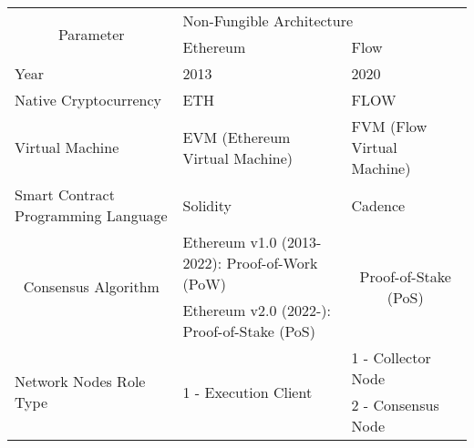 \usepackage{booktabs}
\usepackage{multirow}
\begin{table}[]
    \centering
    \begin{tabular}{@{}|l|ll|@{}}
        \toprule
        \multicolumn{1}{|c|}{\multirow{2}{*}{Parameter}}           & \multicolumn{2}{l|}{Non-Fungible Architecture}                                                                                   \\ \cmidrule(l){2-3}
        \multicolumn{1}{|c|}{}                                     & \multicolumn{1}{l|}{Ethereum}                                       & Flow                                                       \\ \midrule
        Year                                                       & \multicolumn{1}{l|}{2013}                                           & 2020                                                       \\ \midrule
        Native Cryptocurrency                                      & \multicolumn{1}{l|}{ETH}                                            & FLOW                                                       \\ \midrule
        Virtual Machine                                            & \multicolumn{1}{l|}{EVM (Ethereum Virtual Machine)}                 & FVM (Flow Virtual Machine)                                 \\ \midrule
        Smart Contract Programming Language                        & \multicolumn{1}{l|}{Solidity}                                       & Cadence                                                    \\ \midrule
        \multicolumn{1}{|c|}{\multirow{2}{*}{Consensus Algorithm}} & \multicolumn{1}{l|}{Ethereum v1.0 (2013-2022): Proof-of-Work (PoW)} & \multicolumn{1}{c|}{\multirow{2}{*}{Proof-of-Stake (PoS)}} \\ \cmidrule(lr){2-2}
        \multicolumn{1}{|c|}{}                                     & \multicolumn{1}{l|}{Ethereum v2.0 (2022-): Proof-of-Stake (PoS)}    & \multicolumn{1}{c|}{}                                      \\ \midrule
        \multirow{4}{*}{Network Nodes Role Type}                   & \multicolumn{1}{l|}{\multirow{2}{*}{1 - Execution Client}}          & 1 - Collector Node                                         \\ \cmidrule(l){3-3}
                                                                   & \multicolumn{1}{l|}{}                                               & 2 - Consensus Node                                         \\ \cmidrule(l){2-3}

\end{tabular}
\end{table}
